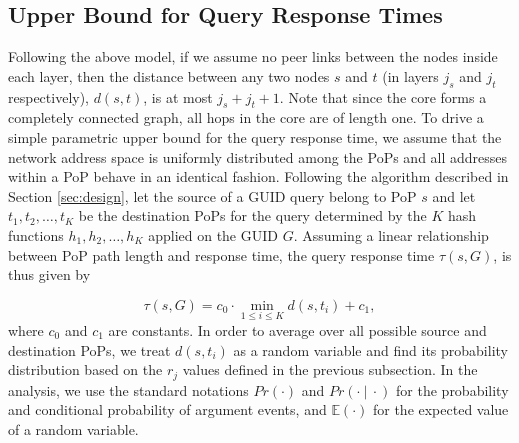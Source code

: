 \subsection{Upper Bound for Query Response Times}
Following the above model, if we assume no peer links between the nodes inside each layer, then the distance between any two nodes $s$ and $t$ (in layers $j_s$ and $j_t$ respectively), $d(s, t)$,  is at most $j_s + j_t + 1$. Note that since the core forms a completely connected graph, all hops in the core are of length one.  To drive a simple parametric upper bound for the query response time, we assume that the network address space is uniformly distributed among the PoPs and all addresses within a PoP behave in an identical fashion. Following the algorithm described in Section \ref{sec:design}, let the source of a GUID query belong to PoP $s$ and let $t_1, t_2, \ldots, t_K$ be the destination PoPs for the query determined by the $K$ hash functions $h_1, h_2, \ldots, h_K$ applied on the GUID $G$. Assuming a linear relationship between PoP path length and response time, the query response time $\tau(s, G)$, is thus given by

\begin{equation}
\tau(s, G) = c_0 \cdot \min_{1 \le i \le K} d (s, t_i) + c_1,
\label{eq:tau}
\end{equation}
where $c_0$ and $c_1$ are constants. In order to average over all possible source and destination PoPs, we treat $d(s, t_i)$ as a random variable and find its probability distribution based on the $r_j$ values defined in the previous subsection. In the analysis, we use the standard notations $Pr (\cdot )$ and $Pr ( \cdot ~|~ \cdot )$ for the probability and conditional probability of argument events, and $ \mathbb{E}( \cdot )$ for the expected value of a random variable.

